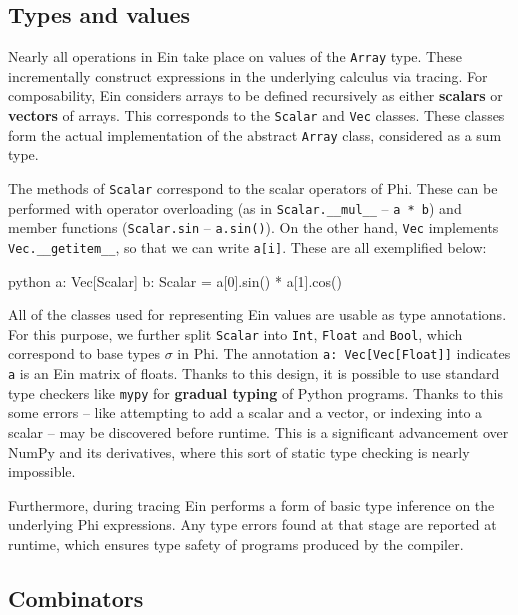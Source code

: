 \subsection{Types and values}

Nearly all operations in Ein take place on values of the \texttt{Array} type. These incrementally construct expressions in the underlying calculus via tracing. For composability, Ein considers arrays to be defined recursively as either \textbf{scalars} or \textbf{vectors} of arrays. This corresponds to the \texttt{Scalar} and \texttt{Vec} classes. These classes form the actual implementation of the abstract \texttt{Array} class, considered as a sum type.

The methods of \texttt{Scalar} correspond to the scalar operators of Phi. These can be performed with operator overloading (as in \texttt{Scalar.\_\_mul\_\_} -- \texttt{a * b}) and member functions (\texttt{Scalar.sin} -- \texttt{a.sin()}). On the other hand, \texttt{Vec} implements \texttt{Vec.\_\_getitem\_\_}, so that we can write \texttt{a[i]}. These are all exemplified below:
\begin{center}
\begin{cminted}{python}
a: Vec[Scalar]
b: Scalar = a[0].sin() * a[1].cos()
\end{cminted}
\end{center}

All of the classes used for representing Ein values are usable as type annotations. For this purpose, we further split \texttt{Scalar} into \texttt{Int}, \texttt{Float} and \texttt{Bool}, which correspond to base types $\sigma$ in Phi. The annotation \texttt{a: Vec[Vec[Float]]} indicates \texttt{a} is an Ein matrix of floats. Thanks to this design, it is possible to use standard type checkers like \texttt{mypy} for \textbf{gradual typing} of Python programs. Thanks to this some errors -- like attempting to add a scalar and a vector, or indexing into a scalar -- may be discovered before runtime. This is a significant advancement over NumPy and its derivatives, where this sort of static type checking is nearly impossible.

Furthermore, during tracing Ein performs a form of basic type inference on the underlying Phi expressions. Any type errors found at that stage are reported at runtime, which ensures type safety of programs produced by the compiler. 

\subsection{Combinators}

